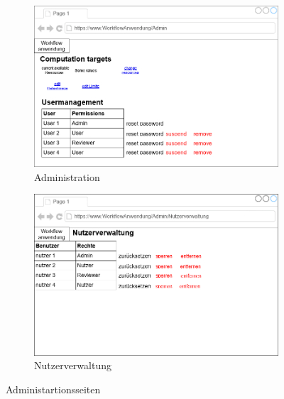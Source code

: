 \begin{figure}[ht]
    \centering
    \begin{subfigure}{.75\textwidth}
        \centering
        \includegraphics[width = \textwidth]{Grafiken/Gui Mockups/workflowGui-admin.drawio.png}
        \caption{Administration}
        \label{fig:sfig1}
    \end{subfigure}
   \begin{subfigure}{.75\textwidth}
    \centering
    \includegraphics[width = \textwidth]{Grafiken/Gui Mockups/nutzerverwaltungGui.drawio.png}
    \caption{Nutzerverwaltung}
    \label{fig:sfig2}
   \end{subfigure}
   \caption{Administartionsseiten}
   \label{fig:Abb 3}
\end{figure}
    

